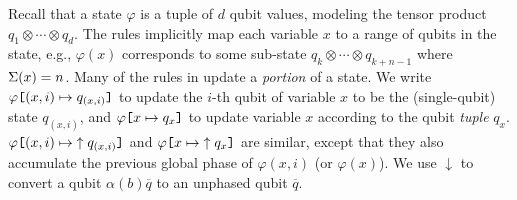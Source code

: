 

Recall that a state $\varphi$ is a tuple of $d$ qubit values,
modeling the tensor product $q_1\otimes \cdots \otimes q_d$. 
The rules implicitly map each variable $x$ to a
range of qubits in the state, e.g., 
$\varphi(x)$ corresponds to some sub-state $q_k\otimes \cdots \otimes q_{k+n-1}$
where $\Omegasz(x)=n$.
%
Many of the rules in  update a \emph{portion} of a
state. We write $\app{q_{(x,i)}}{\varphi}{(x,i)}$ to update the $i$-th
qubit of variable $x$ to be the (single-qubit) state $q_{(x,i)}$, and
$\app{q_{x}}{\varphi}{x}$ to update variable $x$ according to
the qubit \emph{tuple} $q_x$.
$\app{\uparrow q_{(x,i)}}{\varphi}{(x,i)}$ and $\app{\uparrow q_{x}}{\varphi}{x}$ 
are similar, except that they also accumulate the previous global phase of $\varphi(x,i)$ (or $\varphi(x)$).
We use $\downarrow$ to convert a qubit $\alpha(b)\overline{q}$ to an unphased qubit $\overline{q}$.

